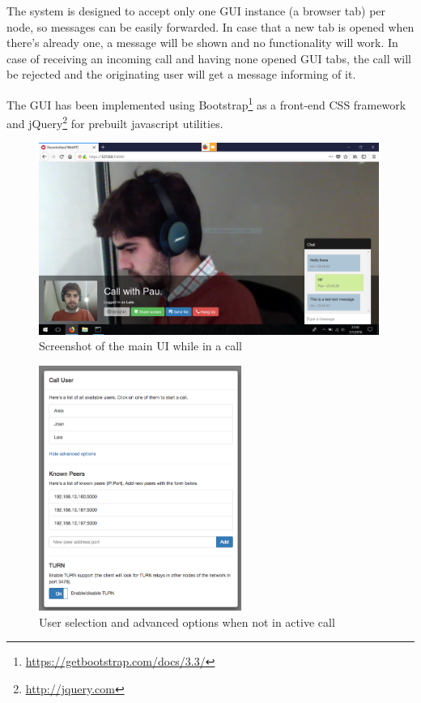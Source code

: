 \documentclass[paper=a4, fontsize=11pt]{scrartcl} %
\numberwithin{equation}{section} %
\numberwithin{figure}{section} %
\numberwithin{table}{section} %
\begin{document}
The system is designed to accept only one GUI instance (a browser tab) per node, so messages can be easily forwarded. In case that a new tab is opened when there's already one, a message will be shown and no functionality will work. In case of receiving an incoming call and having none opened GUI tabs, the call will be rejected and the originating user will get a message informing of it.

The GUI has been implemented using Bootstrap\footnote{\url{https://getbootstrap.com/docs/3.3/}} as a front-end CSS framework and jQuery\footnote{\url{http://jquery.com}} for prebuilt javascript utilities.

\begin{figure}[ht!]
	\centering
	\includegraphics[width=420px]{full-screen.png}
	\caption{Screenshot of the main UI while in a call}
\end{figure}

\begin{figure}[ht!]
	\centering
	\includegraphics[width=250px]{user-selection.png}
	\caption{User selection and advanced options when not in active call}
\end{figure}
\end{document}

